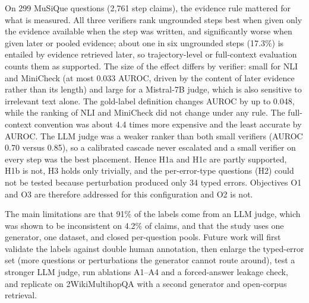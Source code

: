 \documentclass[conference]{IEEEtran}
\begin{document}
On 299 MuSiQue questions (2,761 step claims), the evidence rule mattered for what is measured. All three verifiers rank ungrounded steps best when given only the evidence available when the step was written, and significantly worse when given later or pooled evidence; about one in six ungrounded steps (17.3\%) is entailed by evidence retrieved later, so trajectory-level or full-context evaluation counts them as supported. The size of the effect differs by verifier: small for NLI and MiniCheck (at most 0.033 AUROC, driven by the content of later evidence rather than its length) and large for a Mistral-7B judge, which is also sensitive to irrelevant text alone. The gold-label definition changes AUROC by up to 0.048, while the ranking of NLI and MiniCheck did not change under any rule. The full-context convention was about 4.4 times more expensive and the least accurate by AUROC. The LLM judge was a weaker ranker than both small verifiers (AUROC 0.70 versus 0.85), so a calibrated cascade never escalated and a small verifier on every step was the best placement. Hence H1a and H1c are partly supported, H1b is not, H3 holds only trivially, and the per-error-type questions (H2) could not be tested because perturbation produced only 34 typed errors. Objectives O1 and O3 are therefore addressed for this configuration and O2 is not.

The main limitations are that 91\% of the labels come from an LLM judge, which was shown to be inconsistent on 4.2\% of claims, and that the study uses one generator, one dataset, and closed per-question pools. Future work will first validate the labels against double human annotation, then enlarge the typed-error set (more questions or perturbations the generator cannot route around), test a stronger LLM judge, run ablations A1--A4 and a forced-answer leakage check, and replicate on 2WikiMultihopQA with a second generator and open-corpus retrieval.



\end{document}
